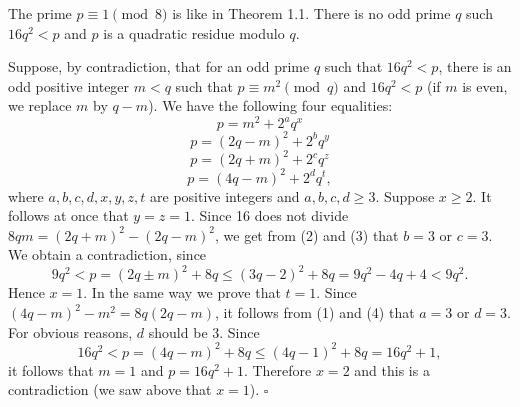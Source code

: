 \documentclass[10pt,a4paper]{amsart}
\newenvironment{proof}{{\it Proof.}}{\hfill $ \square $ \vskip 4mm}
\begin{document}
\begin{lemma}
The prime $p\equiv 1 \pmod 8$ is like in Theorem 1.1. There is no odd prime $q$ such $16q^2<p$ and $p$ is a quadratic residue modulo $q$.
\end{lemma}

\begin{proof}
Suppose, by contradiction, that for an odd prime $q$ such that $16q^2<p$, there is an odd positive integer $m<q$ such that $p\equiv m^2\pmod q$ and $16q^2<p$ (if $m$ is even, we replace $m$ by $q-m$). We have  the following four equalities:
\begin{equation}
p=m^2+2^aq^x
\end{equation}
\begin{equation}
p=(2q-m)^2+2^bq^y
\end{equation}
\begin{equation}
p=(2q+m)^2+2^cq^z
\end{equation}
\begin{equation}
p=(4q-m)^2+2^dq^t,
\end{equation}
where $a,b,c,d,x,y,z,t$ are positive integers and $a,b,c,d\geq 3$.
 Suppose $x\geq 2$. It follows at once that $y=z=1$. Since 16  does not divide $8qm=(2q+m)^2-(2q-m)^2$, we get from (2) and (3) that $b=3$ or $c=3$. We obtain a contradiction, since
$$9q^2<p=(2q\pm m)^2+8q\leq (3q-2)^2+8q=9q^2-4q+4<9q^2.$$ Hence $x=1$. In the same way we prove  that $t=1$. Since $(4q-m)^2-m^2=8q(2q-m)$, it follows from (1) and (4) that $a=3$ or $d=3$. For obvious reasons, $d$ should be 3. Since 
$$16q^2<p=(4q-m)^2+8q\leq (4q-1)^2+8q=16q^2+1,$$ it follows that $m=1$ and $p=16q^2+1$. Therefore $x=2$ and this is a contradiction (we saw above that $x=1$).
\end{proof}
\end{document}
